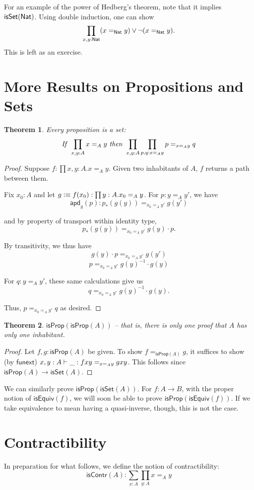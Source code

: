 \documentclass[11pt]{article}
\newcommand*{\apd}{\mathsf{apd}}
\newcommand*{\funext}{\mathsf{funext}}
\newcommand*{\isSet}{\mathsf{isSet}}
\newcommand*{\isProp}{\mathsf{isProp}}
\newcommand*{\isContr}{\mathsf{isContr}}
\newtheorem{thm}{Theorem}
\begin{document}
For an example of the power of Hedberg's theorem, note that it implies $\isSet(\Nat)$.
Using double induction, one can show 
$$\prod_{x,y:\mathsf{Nat}}(x=_{\mathsf{Nat}} y)\vee \neg (x=_{\mathsf{Nat}} y).$$ This is left as an exercise.

\section{More Results on Propositions and Sets}
\begin{thm}
 Every proposition is a set:
 $$\text{\emph{If} }\prod_{x,y:A}x=_A y\text{ \emph{then} }\prod_{x,y:A}\prod_{p,q:x=_A y}p=_{x=_A y} q$$
\end{thm}

\begin{proof}
 Suppose $f:\prod x,y:A.x=_A y$. Given two inhabitants of $A$, $f$ returns a path between them.
 
 Fix $x_0:A$ and let $g \vcentcolon\equiv f(x_0):\prod y:A.x_0=_A y$. For $p:y=_A y'$, we have 
 $$\apd_g(p): p_*(g(y)) =_{x_0=_A y'} g(y')$$
 
 and by property of transport within identity type,
 $$p_*(g(y))=_{x_0=_A y'} g(y)\cdot p.$$
 
 By transitivity, we thus have
 $$g(y)\cdot p =_{x_0=_A y'} g(y')$$
 $$p =_{x_0=_A y'} g(y)^{-1}\cdot g(y)$$
 
 For $q:y=_A y'$, these same calculations give us 
 $$q =_{x_0=_A y'} g(y)^{-1}\cdot g(y).$$
 
 Thus, $p =_{x_0=_A y'} q$ as desired.
\end{proof}

\begin{thm}
 $\isProp(\isProp(A))$ -- that is, there is only one proof that $A$ has only one inhabitant.
\end{thm}
\begin{proof}
 Let $f,g:\isProp(A)$ be given. To show $f =_{\isProp(A)} g$, it suffices to show (by $\funext$)
 $x,y:A\vdash \_: f x y =_{x=_A y} g x y$. This follows since $\isProp(A)\to \isSet(A)$.
\end{proof}

We can similarly prove $\isProp(\isSet(A))$. For $f:A\to B$, with the proper notion of 
$\mathsf{isEquiv}(f)$, we will soon be able to prove $\isProp(\mathsf{isEquiv}(f))$.
If we take equivalence to mean having a quasi-inverse, though, this is not the case.


\section{Contractibility}
In preparation for what follows, we define the notion of contractibility:
$$\isContr(A):\sum_{x:A}\prod_{y:A}x=_A y$$
\end{document}
